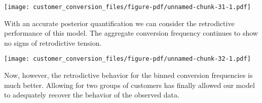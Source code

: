 \documentclass[
  letterpaper,
  DIV=11,
  numbers=noendperiod]{scrartcl}
\newenvironment{Shaded}{\begin{snugshade}}{\end{snugshade}}
\newcommand{\AttributeTok}[1]{\textcolor[rgb]{0.40,0.45,0.13}{#1}}
\newcommand{\ControlFlowTok}[1]{\textcolor[rgb]{0.00,0.23,0.31}{#1}}
\newcommand{\DecValTok}[1]{\textcolor[rgb]{0.68,0.00,0.00}{#1}}
\newcommand{\FunctionTok}[1]{\textcolor[rgb]{0.28,0.35,0.67}{#1}}
\newcommand{\NormalTok}[1]{\textcolor[rgb]{0.00,0.23,0.31}{#1}}
\newcommand{\OtherTok}[1]{\textcolor[rgb]{0.00,0.23,0.31}{#1}}
\newcommand{\SpecialCharTok}[1]{\textcolor[rgb]{0.37,0.37,0.37}{#1}}
\newcommand{\StringTok}[1]{\textcolor[rgb]{0.13,0.47,0.30}{#1}}
\begin{document}
\texttt{[image: customer\_conversion\_files/figure-pdf/unnamed-chunk-31-1.pdf]}

With an accurate posterior quantification we can consider the
retrodictive performance of this model. The aggregate conversion
frequency continues to show no signs of retrodictive tension.

\begin{Shaded}
\end{Shaded}

\texttt{[image: customer\_conversion\_files/figure-pdf/unnamed-chunk-32-1.pdf]}

Now, however, the retrodictive behavior for the binned conversion
frequencies is much better. Allowing for two groups of customers has
finally allowed our model to adequately recover the behavior of the
observed data.

\begin{Shaded}
\end{Shaded}
\end{document}
